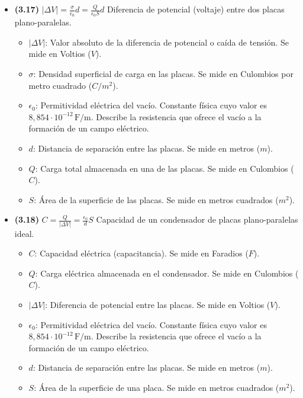 \documentclass{article}
\begin{document}
\begin{itemize}
				\item \textbf{(3.17)} $\boxed{\vert{}\Delta V\vert{} = \frac{\sigma}{\epsilon_0} d = \frac{Q}{\epsilon_0 S} d}$ Diferencia de potencial (voltaje) entre dos placas plano-paralelas.
					\begin{itemize}
						\item $\vert{}\Delta V\vert{}$: Valor absoluto de la diferencia de potencial o caída de tensión. Se mide en Voltios ($V$).
						\item $\sigma$: Densidad superficial de carga en las placas. Se mide en Culombios por metro cuadrado ($C/m^2$).
						\item $\epsilon_{0}$: Permitividad eléctrica del vacío. Constante física cuyo valor es $8,854\cdot10^{-12}\,\text{F/m}$. Describe la resistencia que ofrece el vacío a la formación de un campo eléctrico.
						\item $d$: Distancia de separación entre las placas. Se mide en metros ($m$).
						\item $Q$: Carga total almacenada en una de las placas. Se mide en Culombios ($C$).
						\item $S$: Área de la superficie de las placas. Se mide en metros cuadrados ($m^2$).
					\end{itemize}

				\item \textbf{(3.18)} $\boxed{C = \frac{Q}{\vert{}\Delta V\vert{}} = \frac{\epsilon_0}{d} S}$ Capacidad de un condensador de placas plano-paralelas ideal.
					\begin{itemize}
						\item $C$: Capacidad eléctrica (capacitancia). Se mide en Faradios ($F$).
						\item $Q$: Carga eléctrica almacenada en el condensador. Se mide en Culombios ($C$).
						\item $\vert{}\Delta V\vert{}$: Diferencia de potencial entre las placas. Se mide en Voltios ($V$).
						\item $\epsilon_{0}$: Permitividad eléctrica del vacío. Constante física cuyo valor es $8,854\cdot10^{-12}\,\text{F/m}$. Describe la resistencia que ofrece el vacío a la formación de un campo eléctrico.
						\item $d$: Distancia de separación entre las placas. Se mide en metros ($m$).
						\item $S$: Área de la superficie de una placa. Se mide en metros cuadrados ($m^2$).
					\end{itemize}
			\end{itemize}
\end{document}
